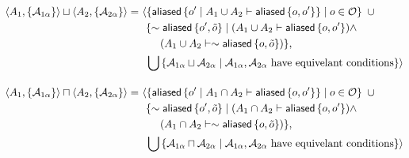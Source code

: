 \begin{align*}
\ctx{A_1}{\set{\A_{1\alpha}}} \contextunion \ctx{A_2}{\set{\A_{2\alpha}}} =& \
\langle
  \set{
    \aliased\set{ o\p \mid A_1 \cup A_2 \entails \aliased\set{o,o\p} }
    \mid
    o \in \O
  } \ \cup \\ & \ \
  \{
    \pnot \aliased\set{o\p, \tilde o}
    \mid
    (A_1 \cup A_2 \entails \aliased\set{o, o\p}) \land \\ & \hspace{2em}
    (A_1 \cup A_2 \entails \pnot \aliased\set{o, \tilde o})
  \}
, \\ & \ \
  \bigcup \set{ \A_{1\alpha} \contextunion \A_{2\alpha} \mid
  \A_{1\alpha}, \A_{2\alpha} \ \text{have equivelant conditions} }
\rangle
%
\\[1em]
%
\ctx{A_1}{\set{\A_{1\alpha}}} \contextintersection \ctx{A_2}{\set{\A_{2\alpha}}} =& \
\langle
  \set{
    \aliased\set{ o\p \mid A_1 \cap A_2 \entails \aliased\set{o,o\p} }
    \mid
    o \in \O
  } \ \cup \\ & \ \
  \{
    \pnot \aliased\set{o\p, \tilde o}
    \mid
    (A_1 \cap A_2 \entails \aliased\set{o, o\p}) \land \\ & \hspace{2em}
    (A_1 \cap A_2 \entails \pnot \aliased\set{o, \tilde o})
  \}
, \\ &  \ \
\bigcup \set{ \A_{1\alpha} \contextintersection \A_{2\alpha} \mid
\A_{1\alpha}, \A_{2\alpha} \ \text{have equivelant conditions} }
\rangle
\\
\end{align*}
